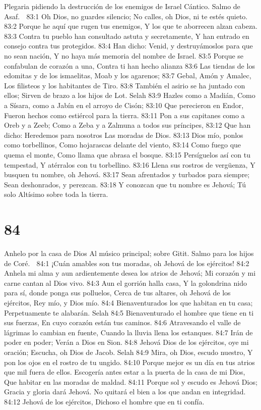 Plegaria pidiendo la destrucción de los enemigos de Israel 
Cántico. Salmo de Asaf. 

83:1 Oh Dios, no guardes silencio; 
No calles, oh Dios, ni te estés quieto. 
83:2 Porque he aquí que rugen tus enemigos, 
Y los que te aborrecen alzan cabeza. 
83:3 Contra tu pueblo han consultado astuta y secretamente, 
Y han entrado en consejo contra tus protegidos. 
83:4 Han dicho: Venid, y destruyámoslos para que no sean nación, 
Y no haya más memoria del nombre de Israel. 
83:5 Porque se confabulan de corazón a una, 
Contra ti han hecho alianza 
83:6 Las tiendas de los edomitas y de los ismaelitas, 
Moab y los agarenos; 
83:7 Gebal, Amón y Amalec, 
Los filisteos y los habitantes de Tiro. 
83:8 También el asirio se ha juntado con ellos; 
Sirven de brazo a los hijos de Lot. Selah 
83:9 Hazles como a Madián, 
Como a Sísara, como a Jabín en el arroyo de Cisón; 
83:10 Que perecieron en Endor, 
Fueron hechos como estiércol para la tierra. 
83:11 Pon a sus capitanes como a Oreb y a Zeeb; 
Como a Zeba y a Zalmuna a todos sus príncipes, 
83:12 Que han dicho: Heredemos para nosotros 
Las moradas de Dios. 
83:13 Dios mío, ponlos como torbellinos, 
Como hojarascas delante del viento, 
83:14 Como fuego que quema el monte, 
Como llama que abrasa el bosque. 
83:15 Persíguelos así con tu tempestad, 
Y atérralos con tu torbellino. 
83:16 Llena sus rostros de vergüenza, 
Y busquen tu nombre, oh Jehová. 
83:17 Sean afrentados y turbados para siempre; 
Sean deshonrados, y perezcan. 
83:18 Y conozcan que tu nombre es Jehová; 
Tú solo Altísimo sobre toda la tierra. 

\chapter{84}

Anhelo por la casa de Dios 
Al músico principal; sobre Gitit. Salmo para los hijos de Coré. 

84:1 ¡Cuán amables son tus moradas, oh Jehová de los ejércitos! 
84:2 Anhela mi alma y aun ardientemente desea los atrios de Jehová; 
Mi corazón y mi carne cantan al Dios vivo. 
84:3 Aun el gorrión halla casa, 
Y la golondrina nido para sí, donde ponga sus polluelos, 
Cerca de tus altares, oh Jehová de los ejércitos, 
Rey mío, y Dios mío. 
84:4 Bienaventurados los que habitan en tu casa; 
Perpetuamente te alabarán. Selah 
84:5 Bienaventurado el hombre que tiene en ti sus fuerzas, 
En cuyo corazón están tus caminos. 
84:6 Atravesando el valle de lágrimas lo cambian en fuente, 
Cuando la lluvia llena los estanques. 
84:7 Irán de poder en poder; 
Verán a Dios en Sion. 
84:8 Jehová Dios de los ejércitos, oye mi oración; 
Escucha, oh Dios de Jacob. Selah 
84:9 Mira, oh Dios, escudo nuestro, 
Y pon los ojos en el rostro de tu ungido. 
84:10 Porque mejor es un día en tus atrios que mil fuera de ellos. 
Escogería antes estar a la puerta de la casa de mi Dios, 
Que habitar en las moradas de maldad. 
84:11 Porque sol y escudo es Jehová Dios; 
Gracia y gloria dará Jehová. 
No quitará el bien a los que andan en integridad. 
84:12 Jehová de los ejércitos, 
Dichoso el hombre que en ti confía. 

